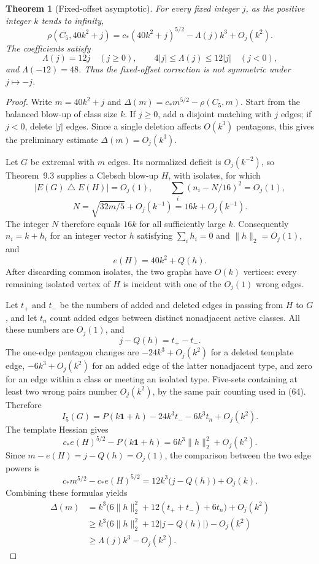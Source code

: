 \documentclass[11pt]{amsart}
\newtheorem{theorem}{Theorem}[section]
\theoremstyle{definition}
\theoremstyle{remark}
\begin{document}
\begin{theorem}[Fixed-offset asymptotic]\label{thm:fixed-offset}
For every fixed integer $j$, as the positive integer $k$ tends to infinity,
\begin{equation}\tag{69}\label{eq:fixed-offset-asymptotic}
 \rho(C_5,40k^2+j)
   =c_\ast(40k^2+j)^{5/2}-\Lambda(j)k^3+O_j(k^2).
\end{equation}
The coefficients satisfy
\[
 \Lambda(j)=12j\quad(j\geq0),\qquad
 4|j|\leq\Lambda(j)\leq12|j|\quad(j<0),
\]
and $\Lambda(-12)=48$. Thus the fixed-offset correction is not symmetric
under $j\mapsto-j$.
\end{theorem}
\begin{proof}
Write $m=40k^2+j$ and $\Delta(m)=c_\ast m^{5/2}-\rho(C_5,m)$. Start
from the balanced blow-up of class size $k$. If $j\geq0$, add a disjoint
matching with $j$ edges; if $j<0$, delete $|j|$ edges. Since a single
deletion affects $O(k^3)$ pentagons, this gives the preliminary estimate
$\Delta(m)=O_j(k^3)$.

Let $G$ be extremal with $m$ edges. Its normalized deficit is
$O_j(k^{-2})$, so Theorem~9.3 supplies a Clebsch blow-up $H$, with
isolates, for which
\[
 |E(G)\mathbin\triangle E(H)|=O_j(1),\qquad
 \sum_i(n_i-N/16)^2=O_j(1),
\]
\[
 N=\sqrt{32m/5}+O_j(k^{-1})=16k+O_j(k^{-1}).
\]
The integer $N$ therefore equals $16k$ for all sufficiently large $k$.
Consequently $n_i=k+h_i$ for an integer vector $h$ satisfying
$\sum_i h_i=0$ and $\lVert h\rVert_2=O_j(1)$, and
\begin{equation}\tag{70}\label{eq:offset-edge-count}
 e(H)=40k^2+Q(h).
\end{equation}
After discarding common isolates, the two graphs have $O(k)$ vertices:
every remaining isolated vertex of $H$ is incident with one of the
$O_j(1)$ wrong edges.

Let $t_+$ and $t_-$ be the numbers of added and deleted edges in passing
from $H$ to $G$, and let $t_n$ count added edges between distinct
nonadjacent active classes. All these numbers are $O_j(1)$, and
\[
 j-Q(h)=t_+-t_-.
\]
The one-edge pentagon changes are $-24k^3+O_j(k^2)$ for a deleted
template edge, $-6k^3+O_j(k^2)$ for an added edge of the latter
nonadjacent type, and zero for an edge within a class or meeting an
isolated type. Five-sets containing at least two wrong pairs number
$O_j(k^2)$, by the same pair counting used in (64). Therefore
\[
 I_5(G)=P(k\mathbf1+h)-24k^3t_--6k^3t_n+O_j(k^2).
\]
The template Hessian gives
\[
 c_\ast e(H)^{5/2}-P(k\mathbf1+h)
   =6k^3\lVert h\rVert_2^2+O_j(k^2).
\]
Since $m-e(H)=j-Q(h)=O_j(1)$, the comparison between the two edge
powers is
\[
 c_\ast m^{5/2}-c_\ast e(H)^{5/2}
   =12k^3\bigl(j-Q(h)\bigr)+O_j(k).
\]
Combining these formulas yields
\begin{align*}
 \Delta(m)
 &=k^3\bigl(6\lVert h\rVert_2^2+12(t_++t_-)+6t_n\bigr)+O_j(k^2)\\
 &\geq k^3\bigl(6\lVert h\rVert_2^2+12|j-Q(h)|\bigr)-O_j(k^2)\\
 &\geq\Lambda(j)k^3-O_j(k^2).
\end{align*}


\end{proof}
\end{document}

